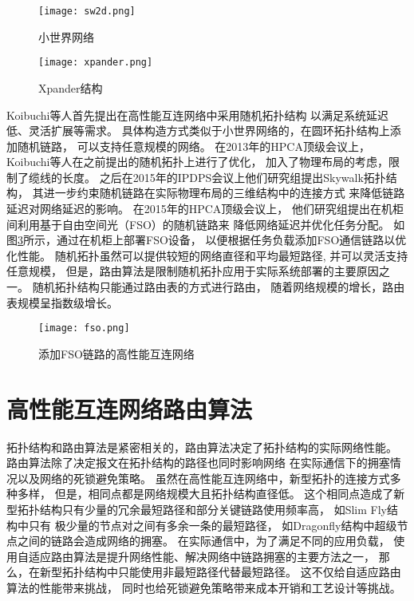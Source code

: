\begin{figure}[htp]
\centering
\texttt{[image: sw2d.png]}
\caption{小世界网络}
\label{sw2d}
\end{figure}

\begin{figure}[htp]
\centering
\texttt{[image: xpander.png]}
\caption{Xpander结构}
\label{xpander}
\end{figure}

Koibuchi等人首先提出在高性能互连网络中采用随机拓扑结构
以满足系统延迟低、灵活扩展等需求。
具体构造方式类似于小世界网络的，在圆环拓扑结构上添加随机链路，
可以支持任意规模的网络。
在2013年的HPCA顶级会议上，
Koibuchi等人在之前提出的随机拓扑上进行了优化，
加入了物理布局的考虑，限制了缆线的长度。
之后在2015年的IPDPS会议上他们研究组提出Skywalk拓扑结构，
其进一步约束随机链路在实际物理布局的三维结构中的连接方式
来降低链路延迟对网络延迟的影响。
在2015年的HPCA顶级会议上，
他们研究组提出在机柜间利用基于自由空间光（FSO）的随机链路来
降低网络延迟并优化任务分配。
如图\ref{fso}所示，通过在机柜上部署FSO设备，
以便根据任务负载添加FSO通信链路以优化性能。
随机拓扑虽然可以提供较短的网络直径和平均最短路径,
并可以灵活支持任意规模，
但是，路由算法是限制随机拓扑应用于实际系统部署的主要原因之一。
随机拓扑结构只能通过路由表的方式进行路由，
随着网络规模的增长，路由表规模呈指数级增长。

\begin{figure}[htp]
\centering
\texttt{[image: fso.png]}
\caption{添加FSO链路的高性能互连网络}
\label{fso}
\end{figure}

\section{高性能互连网络路由算法}

拓扑结构和路由算法是紧密相关的，路由算法决定了拓扑结构的实际网络性能。
路由算法除了决定报文在拓扑结构的路径也同时影响网络
在实际通信下的拥塞情况以及网络的死锁避免策略。
虽然在高性能互连网络中，新型拓扑的连接方式多种多样，
但是，相同点都是网络规模大且拓扑结构直径低。
这个相同点造成了新型拓扑结构只有少量的冗余最短路径和部分关键链路使用频率高，
如Slim Fly结构中只有
极少量的节点对之间有多余一条的最短路径，
如Dragonfly结构中超级节点之间的链路会造成网络的拥塞。
在实际通信中，为了满足不同的应用负载，
使用自适应路由算法是提升网络性能、解决网络中链路拥塞的主要方法之一，
那么，在新型拓扑结构中只能使用非最短路径代替最短路径。
这不仅给自适应路由算法的性能带来挑战，
同时也给死锁避免策略带来成本开销和工艺设计等挑战。


